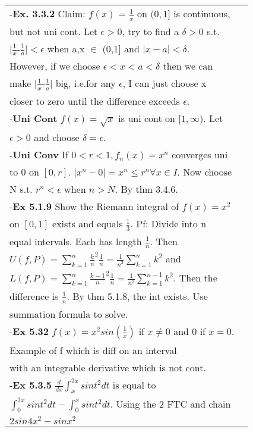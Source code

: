 \documentclass[10 pt,landscape]{article}
\begin{document}
\begin{multicols}{4}
\begin{tabular}{@{}ll@{}}
-\textbf{Ex. 3.3.2} Claim: $f(x)$ = $\frac{1}{x}$ on $(0,1]$ is continuous,\\ but not uni cont. Let $\epsilon >0$, try to find a $\delta > 0$ s.t. \\$|\frac{1}{x}$-$\frac{1}{a}| < \epsilon$ when a,x $\in$ (0,1] and $|x-a| < \delta$.\\ However, if we choose $\epsilon < x < a < \delta$ then we can\\ make $|\frac{1}{x}$-$\frac{1}{a}|$ big, i.e.for any $\epsilon$, I can just choose x\\ closer to zero until the difference exceeds $\epsilon$.\\
-\textbf{Uni Cont} $f(x) = \sqrt{x}$ is uni cont on $[1,\infty)$.  Let\\ $\epsilon > 0$ and choose $\delta = \epsilon$.\\
-\textbf{Uni Conv} If $0 < r < 1, f_n(x) = x^n$ converges uni\\ to 0 on $[0,r]$. $|x^n-0| = x^n \leq r^n \forall  x  \in I$. Now choose\\ N s.t. $r^n < \epsilon$ when $n > N$. By thm 3.4.6.\\
-\textbf{Ex 5.1.9} Show the Riemann integral of $f(x) = x^2$\\ on $[0,1]$ exists and equals $\frac{1}{3}$.  Pf: Divide into n\\equal intervals. Each has length $\frac{1}{n}$.  Then\\ $U(f, P) = \sum_{k=1}^{n} \frac{k}{n}^2\frac{1}{n} = \frac{1}{n^3}\sum_{k=1}^{n} k^2$ and\\ $L(f, P) = \sum_{k=1}^{n} \frac{k-1}{n}^2\frac{1}{n} = \frac{1}{n^3}\sum_{k=1}^{n-1} k^2$.  Then the\\difference is $\frac{1}{n}$. By thm 5.1.8, the int exists. Use\\ summation formula to solve. \\
-\textbf{Ex 5.32} $f(x) = x^2sin(\frac{1}{x})$ if $x \ne 0$ and 0 if $x = 0$.\\Example of f which is diff on an interval\\with an integrable derivative which is not cont.\\
-\textbf{Ex 5.3.5} $\frac{d}{dx}\int_{x}^{2x}sint^2dt$ is equal to\\$\int_{0}^{2x}sint^2dt-\int_{0}^{x}sint^2dt$.  Using the 2 FTC and chain\\$2sin4x^2-sinx^2$
\end{tabular} 






\end{multicols}
\end{document}
